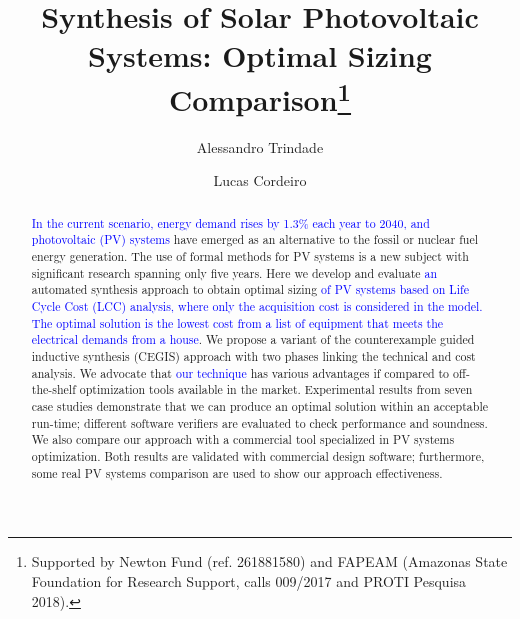 \documentclass[runningheads]{llncs}
\begin{document}
%
\title{Synthesis of Solar Photovoltaic Systems: Optimal Sizing Comparison\thanks{Supported by Newton Fund (ref. 261881580) and FAPEAM (Amazonas State Foundation for Research Support, calls 009/2017 and PROTI Pesquisa 2018).}}
%
%
\author{Alessandro Trindade \and Lucas Cordeiro} %
%
%
\maketitle       %


\begin{abstract}
\textcolor{blue}{In the current scenario, energy demand rises by 1.3\% each year to 2040, and photovoltaic (PV) systems} have emerged as an alternative to the fossil or nuclear fuel energy generation. The use of formal methods for PV systems is a new subject with significant research spanning only five years. Here we develop and evaluate \textcolor{blue}{an} automated synthesis approach to obtain optimal sizing \textcolor{blue}{of PV systems based on Life Cycle Cost (LCC) analysis, where only the acquisition cost is considered in the model. The optimal solution is the lowest cost from a list of equipment that meets the electrical demands from a house}. 
We propose a variant of the counterexample guided inductive synthesis (CEGIS) approach with two phases linking the technical and cost analysis. We advocate that \textcolor{blue}{our technique} has various advantages if compared to off-the-shelf optimization tools available in the market. Experimental results from seven case studies demonstrate that we can produce an optimal solution within an acceptable run-time; different software verifiers are evaluated to check performance and soundness. We also compare our approach with a commercial tool specialized in PV systems optimization. Both results are validated with commercial design software; furthermore, some real PV systems comparison are used to show our approach effectiveness. 
\end{abstract}
\end{document}
